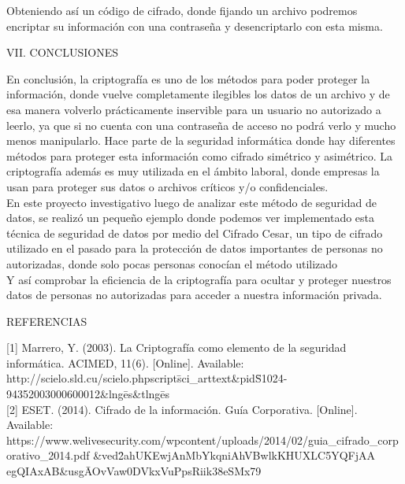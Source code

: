 \documentclass[9pt,24pt,twocolumn]{article}
\begin{document}
{Obteniendo así un código de cifrado, donde fijando un archivo podremos encriptar su información con una contraseña y desencriptarlo con esta misma.}
\\

\begin{center}
{VII. CONCLUSIONES}
\end{center}

{En conclusión, la criptografía es uno de los métodos para poder proteger la información, donde vuelve completamente ilegibles los datos de un archivo y de esa manera volverlo prácticamente inservible para un usuario no autorizado a leerlo, ya que si no cuenta con una contraseña de acceso no podrá verlo y mucho menos manipularlo. Hace parte de la seguridad informática donde hay diferentes métodos para proteger esta información como cifrado simétrico y asimétrico. La criptografía además es muy utilizada en el ámbito laboral, donde empresas la usan para proteger sus datos o archivos críticos y/o confidenciales.}
\\

{En este proyecto investigativo luego de analizar este método de seguridad de datos, se realizó un pequeño ejemplo donde podemos ver implementado esta técnica de seguridad de datos por medio del Cifrado Cesar, un tipo de cifrado utilizado en el pasado para la protección de datos importantes de personas no autorizadas, donde solo pocas personas conocían el método utilizado}
\\

{Y así comprobar la eficiencia de la criptografía para ocultar y proteger nuestros datos de personas no autorizadas para acceder a nuestra información privada.}

\begin{center}
{REFERENCIAS}
\end{center}

{[1] Marrero, Y. (2003). La Criptografía como elemento de la seguridad informática. ACIMED, 11(6). [Online]. Available: }
{http://scielo.sld.cu/scielo.php\?script\=sci_arttext\&pid\=S1024-94352003000600012\&lng\=es\&tlng\=es}
\\

{[2] ESET. (2014). Cifrado de la información. Guía Corporativa. [Online]. Available: }
{https://www.welivesecurity.com/wp\-content/uploads/2014/02/guia\_cifrado\_corporativo\_2014.pdf}
{\&ved\=2ahUKEwjAnMbYkqniAhVBwlkKHUXLC5YQFjAA}
{egQIAxAB\&usg\=AOvVaw0DVkxVuPpsRiik38eSMx79}
\\
\end{document}
